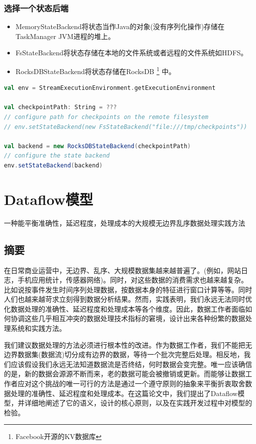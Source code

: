 \documentclass[oneside]{ctexbook}
\begin{document}
\subsection{选择一个状态后端}

\begin{itemize}
\item MemoryStateBackend将状态当作Java的对象(没有序列化操作)存储在TaskManager JVM进程的堆上。
\item FsStateBackend将状态存储在本地的文件系统或者远程的文件系统如HDFS。
\item RocksDBStateBackend将状态存储在RocksDB \footnote{Facebook开源的KV数据库} 中。
\end{itemize}

\begin{lstlisting}[language=scala]
val env = StreamExecutionEnvironment.getExecutionEnvironment

val checkpointPath: String = ???
// configure path for checkpoints on the remote filesystem
// env.setStateBackend(new FsStateBackend("file:///tmp/checkpoints"))

val backend = new RocksDBStateBackend(checkpointPath)
// configure the state backend
env.setStateBackend(backend)
\end{lstlisting}

\chapter{Dataflow模型}

一种能平衡准确性，延迟程度，处理成本的大规模无边界乱序数据处理实践方法

\section{摘要}

在日常商业运营中，无边界、乱序、大规模数据集越来越普遍了。(例如，网站日志，手机应用统计，传感器网络)。同时，对这些数据的消费需求也越来越复杂。比如说按事件发生时间序列处理数据，按数据本身的特征进行窗口计算等等。同时人们也越来越苛求立刻得到数据分析结果。然而，实践表明，我们永远无法同时优化数据处理的准确性、延迟程度和处理成本等各个维度。因此，数据工作者面临如何协调这些几乎相互冲突的数据处理技术指标的窘境，设计出来各种纷繁的数据处理系统和实践方法。

我们建议数据处理的方法必须进行根本性的改进。作为数据工作者，我们不能把无边界数据集(数据流)切分成有边界的数据，等待一个批次完整后处理。相反地，我们应该假设我们永远无法知道数据流是否终结，何时数据会变完整。唯一应该确信的是，新的数据会源源不断而来，老的数据可能会被撤销或更新。而能够让数据工作者应对这个挑战的唯一可行的方法是通过一个遵守原则的抽象来平衡折衷取舍数据处理的准确性、延迟程度和处理成本。在这篇论文中，我们提出了Dataflow模型，并详细地阐述了它的语义，设计的核心原则，以及在实践开发过程中对模型的检验。
\end{document}
